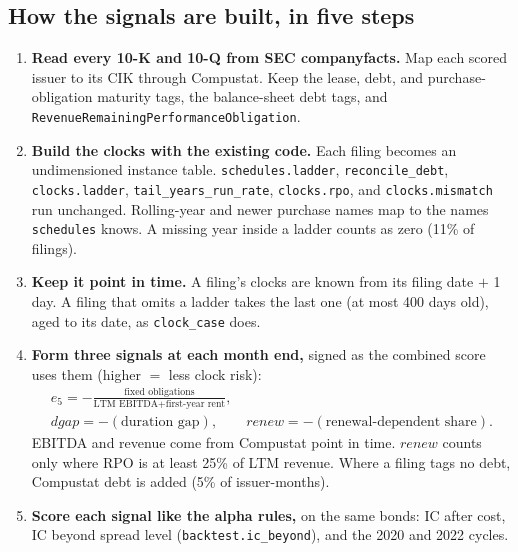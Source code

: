 \documentclass[11pt,a4paper]{article}
\newcommand{\code}[1]{\texttt{\small #1}}
\begin{document}
\subsection*{How the signals are built, in five steps}
\begin{enumerate}
\item \textbf{Read every 10-K and 10-Q from SEC companyfacts.} Map each scored issuer to its CIK through Compustat. Keep the lease, debt, and purchase-obligation maturity tags, the balance-sheet debt tags, and \code{RevenueRemainingPerformanceObligation}.
\item \textbf{Build the clocks with the existing code.} Each filing becomes an undimensioned instance table. \code{schedules.ladder}, \code{reconcile\_debt}, \code{clocks.ladder}, \code{tail\_years\_run\_rate}, \code{clocks.rpo}, and \code{clocks.mismatch} run unchanged. Rolling-year and newer purchase names map to the names \code{schedules} knows. A missing year inside a ladder counts as zero (11\% of filings).
\item \textbf{Keep it point in time.} A filing's clocks are known from its filing date $+$ 1 day. A filing that omits a ladder takes the last one (at most 400 days old), aged to its date, as \code{clock\_case} does.
\item \textbf{Form three signals at each month end,} signed as the combined score uses them (higher $=$ less clock risk):
\begin{gather*}
e_5 = -\frac{\text{fixed obligations}}{\text{LTM EBITDA} + \text{first-year rent}},\\
dgap = -(\text{duration gap}),\qquad renew = -(\text{renewal-dependent share}).
\end{gather*}
EBITDA and revenue come from Compustat point in time. $renew$ counts only where RPO is at least 25\% of LTM revenue. Where a filing tags no debt, Compustat debt is added (5\% of issuer-months).
\item \textbf{Score each signal like the alpha rules,} on the same bonds: IC after cost, IC beyond spread level (\code{backtest.ic\_beyond}), and the 2020 and 2022 cycles.
\end{enumerate}
\end{document}
